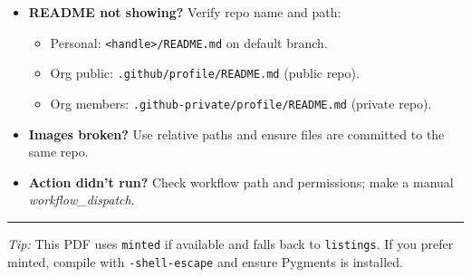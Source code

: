 \documentclass[11pt]{article}
\renewcommand{\kbd}[1]{\texttt{#1}}
\begin{document}
\begin{itemize}
  \item \textbf{README not showing?} Verify repo name and path:
  \begin{itemize}
    \item Personal: \kbd{<handle>/README.md} on default branch.
    \item Org public: \kbd{.github/profile/README.md} (public repo).
    \item Org members: \kbd{.github-private/profile/README.md} (private repo).
  \end{itemize}
  \item \textbf{Images broken?} Use relative paths and ensure files are committed to the same repo.
  \item \textbf{Action didn't run?} Check workflow path and permissions; make a manual \emph{workflow\_dispatch}.
\end{itemize}

\vfill
\hrule
\smallskip
{\footnotesize \textit{Tip:} This PDF uses \texttt{minted} if available and falls back to \texttt{listings}. If you prefer minted, compile with \texttt{-shell-escape} and ensure Pygments is installed.}
\end{document}

